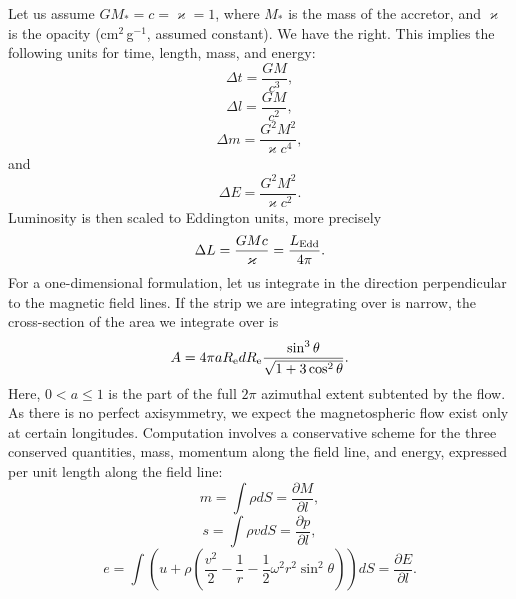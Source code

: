 \documentclass[usenatbib]{mnras}
\newcommand{\pardir}[2]{\ensuremath{\frac{\partial #2}{\partial #1} }}
\begin{document}
Let us assume $GM_*=c=\varkappa=1$, where $M_*$ is the mass of the accretor,
and $\varkappa$ is the opacity
(cm$^2$\,g$^{-1}$, assumed constant). We have the right. This implies the
following units for time, length, mass, and energy:
\begin{equation}\label{E:timedep:time}
  \Delta t = \frac{GM}{c^3},
\end{equation}
\begin{equation}\label{E:timedep:length}
  \Delta l = \frac{GM}{c^2},
\end{equation}
\begin{equation}\label{E:timedep:mass}
  \Delta m = \frac{G^2M^2}{\varkappa c^4},
\end{equation}
and
\begin{equation}\label{E:timedep:energy}
  \Delta E = \frac{G^2M^2}{\varkappa c^2}.
\end{equation}
Luminosity is then scaled to Eddington units, more precisely 
\begin{equation}\label{E:timedep:luminosity}
  \Delta L = \frac{GM c}{\varkappa} =  \frac{L_{\rm Edd}}{4\pi}.
\end{equation}
For a one-dimensional formulation, let us integrate in the direction
perpendicular to the magnetic field lines. If the strip we are integrating
over is narrow, the cross-section of the area we
integrate over is
\begin{equation}\label{E:timedep:across}
\displaystyle  A = 4\pi a R_{\rm e} dR_{\rm e} \frac{\sin^3\theta
}{\sqrt{1+3\cos^2\theta}}.
\end{equation}
Here, $0<a\leq 1$ is the part of the full $2\pi$ azimuthal extent subtented by
the flow. As there is no perfect axisymmetry, we expect the magnetospheric
flow exist only at certain longitudes. 
Computation involves a conservative scheme for the three conserved quantities,
mass, momentum along the field line, and energy, expressed per unit length
along the field line:
\begin{equation}\label{E:timedep:m}
  m = \int \rho dS = \pardir{l}{M},
\end{equation}
\begin{equation}\label{E:timedep:s}
  s = \int \rho v dS = \pardir{l}{p},
\end{equation}
\begin{equation}\label{E:timedep:e}
\displaystyle  e = \int \left(u + \rho \left( \frac{v^2}{2} -\frac{1}{r} - \frac{1}{2} \omega^2 r^2\sin^2\theta \right) \right) dS = \pardir{l}{E}.
\end{equation}
\end{document}
